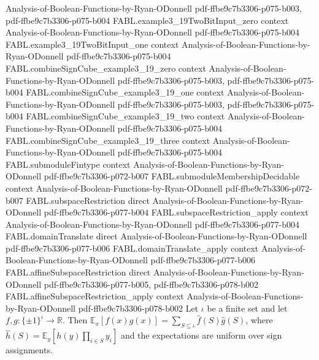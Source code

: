 \begin{theorem}
  {Analysis-of-Boolean-Functions-by-Ryan-ODonnell}
  {pdf-ffbe9c7b3306-p075-b003,
    pdf-ffbe9c7b3306-p075-b004}
\proofstep
  {FABL.example3_19TwoBitInput_zero}
  {context}
  {Analysis-of-Boolean-Functions-by-Ryan-ODonnell}
  {pdf-ffbe9c7b3306-p075-b004}
\proofstep
  {FABL.example3_19TwoBitInput_one}
  {context}
  {Analysis-of-Boolean-Functions-by-Ryan-ODonnell}
  {pdf-ffbe9c7b3306-p075-b004}
\proofstep
  {FABL.combineSignCube_example3_19_zero}
  {context}
  {Analysis-of-Boolean-Functions-by-Ryan-ODonnell}
  {pdf-ffbe9c7b3306-p075-b003,
    pdf-ffbe9c7b3306-p075-b004}
\proofstep
  {FABL.combineSignCube_example3_19_one}
  {context}
  {Analysis-of-Boolean-Functions-by-Ryan-ODonnell}
  {pdf-ffbe9c7b3306-p075-b003,
    pdf-ffbe9c7b3306-p075-b004}
\proofstep
  {FABL.combineSignCube_example3_19_two}
  {context}
  {Analysis-of-Boolean-Functions-by-Ryan-ODonnell}
  {pdf-ffbe9c7b3306-p075-b004}
\proofstep
  {FABL.combineSignCube_example3_19_three}
  {context}
  {Analysis-of-Boolean-Functions-by-Ryan-ODonnell}
  {pdf-ffbe9c7b3306-p075-b004}
\proofstep
  {FABL.submoduleFintype}
  {context}
  {Analysis-of-Boolean-Functions-by-Ryan-ODonnell}
  {pdf-ffbe9c7b3306-p072-b007}
\proofstep
  {FABL.submoduleMembershipDecidable}
  {context}
  {Analysis-of-Boolean-Functions-by-Ryan-ODonnell}
  {pdf-ffbe9c7b3306-p072-b007}
\proofstep
  {FABL.subspaceRestriction}
  {direct}
  {Analysis-of-Boolean-Functions-by-Ryan-ODonnell}
  {pdf-ffbe9c7b3306-p077-b004}
\proofstep
  {FABL.subspaceRestriction_apply}
  {context}
  {Analysis-of-Boolean-Functions-by-Ryan-ODonnell}
  {pdf-ffbe9c7b3306-p077-b004}
\proofstep
  {FABL.domainTranslate}
  {direct}
  {Analysis-of-Boolean-Functions-by-Ryan-ODonnell}
  {pdf-ffbe9c7b3306-p077-b006}
\proofstep
  {FABL.domainTranslate_apply}
  {context}
  {Analysis-of-Boolean-Functions-by-Ryan-ODonnell}
  {pdf-ffbe9c7b3306-p077-b006}
\proofstep
  {FABL.affineSubspaceRestriction}
  {direct}
  {Analysis-of-Boolean-Functions-by-Ryan-ODonnell}
  {pdf-ffbe9c7b3306-p077-b005,
    pdf-ffbe9c7b3306-p078-b002}
\proofstep
  {FABL.affineSubspaceRestriction_apply}
  {context}
  {Analysis-of-Boolean-Functions-by-Ryan-ODonnell}
  {pdf-ffbe9c7b3306-p078-b002}
Let $\iota$ be a finite set and let $f,g:\{\pm1\}^{\iota}\to\mathbb R$. Then $\mathbb
E_x[f(x)g(x)]=\sum_{S\subseteq\iota}\widehat f(S)\widehat g(S)$, where $\widehat
h(S)=\mathbb E_y[h(y)\prod_{i\in S}y_i]$ and the expectations are uniform over sign
assignments.
\end{theorem}

